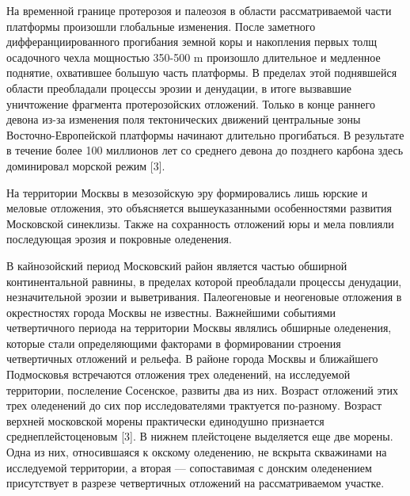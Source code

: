 На временной границе протерозоя и палеозоя в области рассматриваемой части платформы 
произошли глобальные изменения. После заметного 
дифферанциированного прогибания земной коры и накопления первых толщ осадочного чехла
мощностью 350-500 \si{\meter} произошло длительное и медленное поднятие, охватившее
большую часть платформы. В пределах этой поднявшейся области преобладали процессы 
эрозии и денудации, в итоге вызвавшие уничтожение фрагмента протерозойских отложений. 
Только в конце раннего девона из-за изменения поля тектонических движений центральные 
зоны Восточно-Европейской платформы
начинают длительно прогибаться. В результате в течение более 100 миллионов лет 
со среднего девона до позднего карбона здесь доминировал морской режим [3].

На территории Москвы в мезозойскую эру формировались лишь юрские и меловые отложения, это объясняется 
вышеуказанными особенностями развития Московской синеклизы. Также на сохранность 
отложений юры и мела повлияли последующая эрозия и покровные оледенения.

В кайнозойский период Московский район является частью обширной континентальной равнины,
в пределах которой преобладали процессы денудации, незначительной эрозии и выветривания.
Палеогеновые и неогеновые отложения в окрестностях города Москвы не известны.
Важнейшими событиями четвертичного периода на территории Москвы являлись 
обширные оледенения, которые стали определяющими факторами в формировании 
строения четвертичных отложений и рельефа. В районе города Москвы и ближайшего 
Подмосковья встречаются отложения трех оледенений, на исследуемой территории,
послеление Сосенское, развиты два из них. Возраст отложений этих трех оледенений 
до сих пор исследователями трактуется по-разному. Возраст верхней московской 
морены практически единодушно признается среднеплейстоценовым [3]. 
В нижнем плейстоцене выделяется еще две морены. Одна из них, относившаяся 
к окскому оледенению, не вскрыта скважинами на исследуемой территории, а 
вторая --- сопоставимая с донским оледенением присутствует в разрезе 
четвертичных отложений на рассматриваемом участке.

